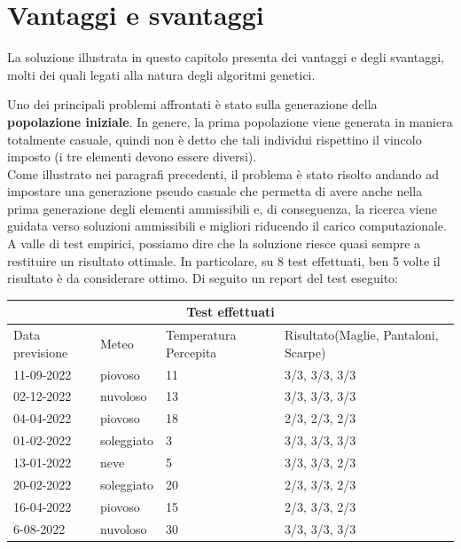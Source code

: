 \documentclass[a4paper, 11pt, oneside]{report}
\begin{document}
            \section{Vantaggi e svantaggi}
            La soluzione illustrata in questo capitolo presenta dei vantaggi e degli svantaggi, molti dei quali legati
            alla natura degli algoritmi genetici.
            \par \noindent Uno dei principali problemi affrontati è stato sulla generazione della \textbf{popolazione iniziale}.
            In genere, la prima popolazione viene generata in maniera totalmente casuale, quindi non è detto che
            tali individui rispettino il vincolo imposto (i tre elementi devono essere diversi).\\
            Come illustrato nei paragrafi precedenti, il problema è stato risolto andando ad impostare una generazione
            pseudo casuale che permetta di avere anche nella prima generazione degli elementi ammissibili e, di conseguenza,
            la ricerca viene guidata verso soluzioni ammissibili e migliori riducendo il carico computazionale.\\
            A valle di test empirici, possiamo dire che la soluzione riesce quasi sempre a restituire un risultato ottimale.
            In particolare, su 8 test effettuati, ben 5 volte il risultato è da considerare ottimo.
            Di seguito un report del test eseguito:
            \begin{center}
                \begin{tabular}{ |p{3cm}|p{2cm}|p{2cm}||p{4cm}|}
                    \hline
                    \multicolumn{4}{|c|}{Test effettuati} \\
                    \hline
                    Data previsione & Meteo & Temperatura Percepita & Risultato(Maglie, Pantaloni, Scarpe)\\
                    \hline
                    11-09-2022 & piovoso  & 11 & 3/3, 3/3, 3/3\\
                    \hline
                    02-12-2022 & nuvoloso  & 13 & 3/3, 3/3, 3/3\\
                    \hline
                    04-04-2022 & piovoso  & 18 & 2/3, 2/3, 2/3\\
                    \hline
                    01-02-2022 & soleggiato  & 3 & 3/3, 3/3, 3/3\\
                    \hline
                    13-01-2022 & neve  & 5 & 3/3, 3/3, 2/3\\
                    \hline
                    20-02-2022 & soleggiato  & 20 & 2/3, 3/3, 2/3\\
                    \hline
                    16-04-2022 & piovoso  & 15 & 2/3, 3/3, 2/3\\
                    \hline
                    6-08-2022 & nuvoloso  & 30 & 3/3, 3/3, 3/3\\
                    \hline
                \end{tabular}
            \end{center}
\end{document}
